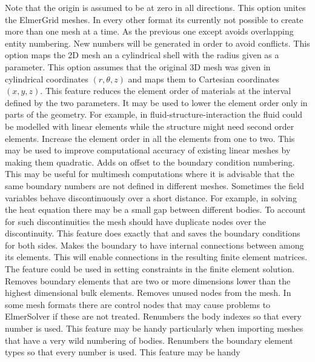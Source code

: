 Note that the origin is assumed to be at zero in all directions.
%
This option unites the ElmerGrid meshes. In every other format its currently
not possible to create more than one mesh at a time.
As the previous one except avoids overlapping entity numbering.
New numbers will be generated in order to avoid conflicts.
%
This option maps the 2D mesh an a cylindrical shell with the radius
given as a parameter.
%
This option assumes that the original 3D mesh was given in 
cylindrical coordinates $(r,\theta,z)$ and maps them to Cartesian 
coordinates $(x,y,z)$.
%
This feature reduces the element order of materials at the interval
defined by the two parameters. It may be used to lower the element order 
only in parts of the geometry. For example, in fluid-structure-interaction the 
fluid could be modelled with linear elements while the 
structure might need second order elements.
%
Increase the element order in all the elements from one to two.
This may be used to improve computational accuracy of existing 
linear meshes by making them quadratic.
%
Adds on offset to the boundary condition numbering. This may be useful for multimesh
computations where it is advisable that the same boundary numbers are not defined in 
different meshes. 
%
Sometimes the field variables behave discontinuously over a short distance.
For example, in solving the heat equation there may be a small gap between
different bodies. To account for such discontinuities the mesh should
have duplicate nodes over the discontinuity. This feature does exactly that
and saves the boundary conditions for both sides.
%
Makes the boundary to have internal connections between among its elements. This
will enable connections in the resulting finite element matrices. The feature could 
be used in setting constraints in the finite element solution. 
%
Removes boundary elements that are two or more dimensions lower than the 
highest dimensional bulk elements. 
%
Removes unused nodes from the mesh. In some mesh formats there are control nodes 
that may cause problems to ElmerSolver if these are not treated.
%
Renumbers the body indexes so that every number is used. This feature may be handy 
particularly when importing meshes that have a very wild numbering of bodies.
%
Renumbers the boundary element types so that every number is used. This feature may be handy 
